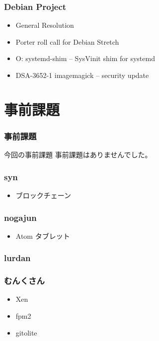 \documentclass[cjk,dvipdfmx,10pt,compress,%
hyperref={bookmarks=true,bookmarksnumbered=true,bookmarksopen=false,%
colorlinks=false,%
pdftitle={第 113 回 関西 Debian 勉強会},%
pdfauthor={倉敷・のがた・佐々木・かわだ},%
pdfsubject={資料},%
}]{beamer}
\begin{document}
\begin{frame}[fragile]
  \frametitle{Debian Project}
  \begin{itemize}
  \item General Resolution
  \item Porter roll call for Debian Stretch
  \item O: systemd-shim -- SysVinit shim for systemd
  \item DSA-3652-1 imagemagick -- security update
  \end{itemize}
\end{frame}


\section{事前課題}

\begin{frame}[fragile]
  \frametitle{事前課題}
  \begin{block}{今回の事前課題}
    事前課題はありませんでした。
  \end{block}
\end{frame}


\begin{frame}
  \frametitle{ syn }
  \begin{itemize}
  \item ブロックチェーン
  \end{itemize}
\end{frame}

\begin{frame}
  \frametitle{ nogajun }
  \begin{itemize}
  \item Atom タブレット
  \end{itemize}
\end{frame}

\begin{frame}
  \frametitle{ lurdan }
\end{frame}

\begin{frame}
  \frametitle{ むんくさん }
  \begin{itemize}
  \item Xen
  \item fpm2
  \item gitolite
  \end{itemize}
\end{frame}
\end{document}
